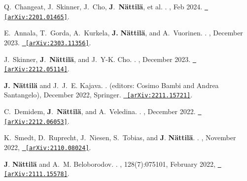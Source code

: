 \documentclass[letterpaper, onecolumn, 11pt]{article}
\begin{document}
\begin{thebibliography}{10}


Q.~{Changeat}, J.~{Skinner}, J.~{Cho}, \textbf{J}.~{\textbf{N\"attil\"a}}, et al. 
.
, Feb 2024.
\href{http://arxiv.org/abs/2401.01465}{\nolinkurl{ [arXiv:2201.01465]}}.

E.~{Annala}, T.~{Gorda}, A.~{Kurkela}, \textbf{J.} \textbf{{N{\"a}ttil{\"a}}},
  and A.~{Vuorinen}.
.
, December 2023.
\href{http://arxiv.org/abs/2303.11356}{\nolinkurl{ [arXiv:2303.11356]}}.

J.~{Skinner}, \textbf{J}.~{\textbf{N\"attil\"a}}, and J.~Y-K. {Cho}.
.
, December 2023.
\href{http://arxiv.org/abs/2212.05114}{\nolinkurl{ [arXiv:2212.05114]}}.

\textbf{J. N\"attil\"a} and J.~J.~E. {Kajava}.
.
\newblock (editors: Cosimo Bambi and Andrea Santangelo), December 2022, Springer.
\href{http://arxiv.org/abs/2211.15721}{\nolinkurl{ [arXiv:2211.15721]}}.

C.~{Demidem}, \textbf{J}.~{\textbf{N\"attil\"a}}, and A.~{Veledina}.
.
, December 2022.
\href{http://arxiv.org/abs/2212.06053}{\nolinkurl{ [arXiv:2212.06053]}}.

K.~{Smedt}, D.~{Ruprecht}, J.~{Niesen}, S.~{Tobias}, and \textbf{J}.
  {\textbf{N{\"a}ttil{\"a}}}.
.
, November 2022,
  \href{http://arxiv.org/abs/2110.08024}{\nolinkurl{ [arXiv:2110.08024]}}.

\textbf{J}. \textbf{N{\"a}ttil{\"a}} and A.~M. {Beloborodov}.
.
\newblock {\em \prl}, 128(7):075101, February 2022,
  \href{http://arxiv.org/abs/2111.15578}{\nolinkurl{ [arXiv:2111.15578]}}.



\end{thebibliography}
\end{document}
